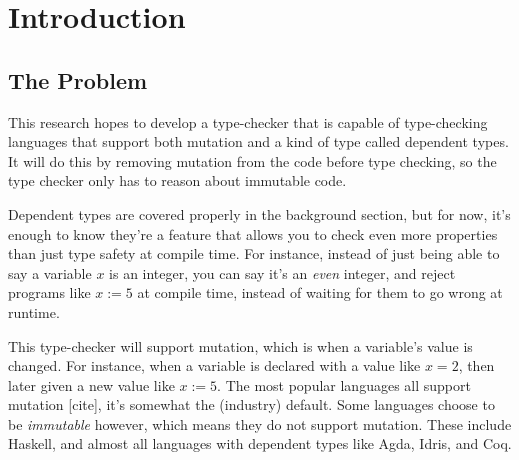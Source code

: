 \documentclass[12pt,twoside]{report}
\begin{document}



\clearpage{\pagestyle{empty}\cleardoublepage}
\setcounter{page}{1}
\pagestyle{fancy}


\cleardoublepage


\tableofcontents 


\setcounter{page}{1}
\fancyhead[LE,RO]{\slshape \rightmark}
\fancyhead[LO,RE]{\slshape \leftmark}

\chapter{Introduction}
\section{The Problem}
This research hopes to develop a type-checker that is capable of type-checking languages that support both mutation and a kind of type called dependent types. It will do this by removing mutation from the code before type checking, so the type checker only has to reason about immutable code.

Dependent types are covered properly in the background section, but for now, it's enough to know they're a feature that allows you to check even more properties than just type safety at compile time. For instance, instead of just being able to say a variable $x$ is an integer, you can say it's an \textit{even} integer, and reject programs like $x := 5$ at compile time, instead of waiting for them to go wrong at runtime.

This type-checker will support mutation, which is when a variable's value is changed. For instance, when a variable is declared with a value like $x = 2$, then later given a new value like $x := 5$. The most popular languages all support mutation [cite], it's somewhat the (industry) default. Some languages choose to be \textit{immutable} however, which means they do not support mutation. These include Haskell, and almost all languages with dependent types like Agda, Idris, and Coq.
\end{document}
